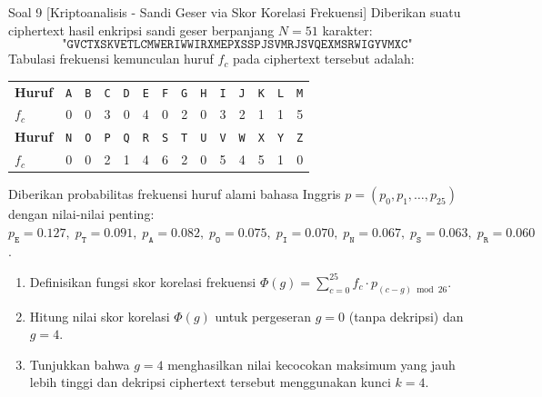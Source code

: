 \documentclass[11pt,a4paper]{article}
\begin{document}
\begin{soalanalisis}{Soal 9 [Kriptoanalisis - Sandi Geser via Skor Korelasi Frekuensi]}
Diberikan suatu ciphertext hasil enkripsi sandi geser berpanjang $N = 51$ karakter:
\[
\texttt{"GVCTXSKVETLCMWERIWWIRXMEPXSSPJSVMRJSVQEXMSRWIGYVMXC"}
\]
Tabulasi frekuensi kemunculan huruf $f_c$ pada ciphertext tersebut adalah:
\begin{center}
\footnotesize
\begin{tabular}{l *{13}{c}}
\toprule
\textbf{Huruf} & \texttt{A} & \texttt{B} & \texttt{C} & \texttt{D} & \texttt{E} & \texttt{F} & \texttt{G} & \texttt{H} & \texttt{I} & \texttt{J} & \texttt{K} & \texttt{L} & \texttt{M} \\
$f_c$ & 0 & 0 & 3 & 0 & 4 & 0 & 2 & 0 & 3 & 2 & 1 & 1 & 5 \\
\midrule
\textbf{Huruf} & \texttt{N} & \texttt{O} & \texttt{P} & \texttt{Q} & \texttt{R} & \texttt{S} & \texttt{T} & \texttt{U} & \texttt{V} & \texttt{W} & \texttt{X} & \texttt{Y} & \texttt{Z} \\
$f_c$ & 0 & 0 & 2 & 1 & 4 & 6 & 2 & 0 & 5 & 4 & 5 & 1 & 0 \\
\bottomrule
\end{tabular}
\end{center}
Diberikan probabilitas frekuensi huruf alami bahasa Inggris $p = (p_0, p_1, \dots, p_{25})$ dengan nilai-nilai penting:
$p_{\texttt{E}} = 0.127, \; p_{\texttt{T}} = 0.091, \; p_{\texttt{A}} = 0.082, \; p_{\texttt{O}} = 0.075, \; p_{\texttt{I}} = 0.070, \; p_{\texttt{N}} = 0.067, \; p_{\texttt{S}} = 0.063, \; p_{\texttt{R}} = 0.060$.
\begin{enumerate}[label=(\alph*)]
    \item Definisikan fungsi skor korelasi frekuensi $\Phi(g) = \sum_{c=0}^{25} f_c \cdot p_{(c-g) \bmod 26}$.
    \item Hitung nilai skor korelasi $\Phi(g)$ untuk pergeseran $g = 0$ (tanpa dekripsi) dan $g = 4$.
    \item Tunjukkan bahwa $g = 4$ menghasilkan nilai kecocokan maksimum yang jauh lebih tinggi dan dekripsi ciphertext tersebut menggunakan kunci $k = 4$.
\end{enumerate}
\end{soalanalisis}
\end{document}
